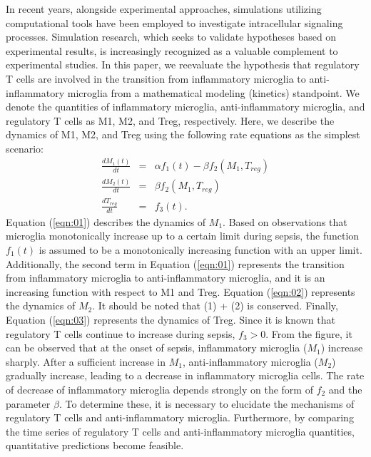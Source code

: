 \documentclass{jsarticle}
\begin{document}
In recent years, alongside experimental approaches, simulations utilizing computational tools have been employed to investigate intracellular signaling processes. Simulation research, which seeks to validate hypotheses based on experimental results, is increasingly recognized as a valuable complement to experimental studies. In this paper, we reevaluate the hypothesis that regulatory T cells are involved in the transition from inflammatory microglia to anti-inflammatory microglia from a mathematical modeling (kinetics) standpoint. 
We denote the quantities of inflammatory microglia, anti-inflammatory microglia, and regulatory T cells as M1, M2, and Treg, respectively. Here, we describe the dynamics of M1, M2, and Treg using the following rate equations as the simplest scenario:
\begin{eqnarray}
  \label{eqn:01}
  \frac{dM_{1}(t)}{dt} &=& \alpha f_1(t)- \beta f_2(M_1, T_{reg}) \\
  \label{eqn:02}
  \frac{dM_2(t)}{dt} &=& \beta f_2(M_1, T_{reg}) \\
  \label{eqn:03}
  \frac{dT_{reg}}{dt} &=& f_3(t).
\end{eqnarray}
Equation (\ref{eqn:01}) describes the dynamics of $M_1$. Based on observations that microglia monotonically increase up to a certain limit during sepsis, the function $f_1(t)$ is assumed to be a monotonically increasing function with an upper limit. Additionally, the second term in Equation (\ref{eqn:01}) represents the transition from inflammatory microglia to anti-inflammatory microglia, and it is an increasing function with respect to M1 and Treg. Equation (\ref{eqn:02}) represents the dynamics of $M_2$. It should be noted that (1) + (2) is conserved. Finally, Equation (\ref{eqn:03}) represents the dynamics of Treg. Since it is known that regulatory T cells continue to increase during sepsis, $f_3 > 0$. From the figure, it can be observed that at the onset of sepsis, inflammatory microglia ($M_1$) increase sharply. After a sufficient increase in $M_1$, anti-inflammatory microglia ($M_2$) gradually increase, leading to a decrease in inflammatory microglia cells. The rate of decrease of inflammatory microglia depends strongly on the form of $f_2$ and the parameter $\beta$. To determine these, it is necessary to elucidate the mechanisms of regulatory T cells and anti-inflammatory microglia. Furthermore, by comparing the time series of regulatory T cells and anti-inflammatory microglia quantities, quantitative predictions become feasible.
\end{document}

